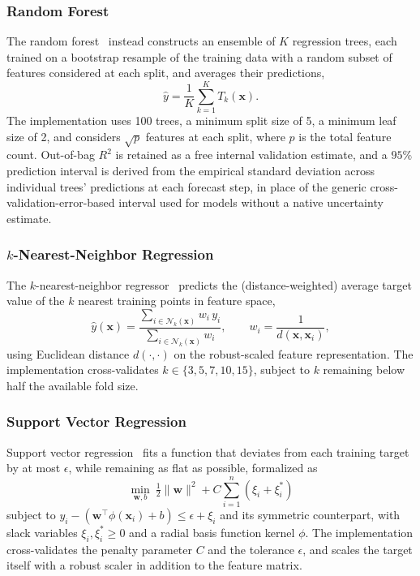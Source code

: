 \subsubsection{Random Forest}
The random forest~\cite{breiman2001randomforest} instead constructs an ensemble of $K$ regression trees, each trained on a bootstrap resample of the training data with a random subset of features considered at each split, and averages their predictions,
\begin{equation}
\hat{y} = \frac{1}{K}\sum_{k=1}^{K} T_k(\mathbf{x}).
\end{equation}
The implementation uses 100 trees, a minimum split size of 5, a minimum leaf size of 2, and considers $\sqrt{p}$ features at each split, where $p$ is the total feature count. Out-of-bag $R^2$ is retained as a free internal validation estimate, and a $95\%$ prediction interval is derived from the empirical standard deviation across individual trees' predictions at each forecast step, in place of the generic cross-validation-error-based interval used for models without a native uncertainty estimate.

\subsubsection{$k$-Nearest-Neighbor Regression}
The $k$-nearest-neighbor regressor~\cite{cover1967knn} predicts the (distance-weighted) average target value of the $k$ nearest training points in feature space,
\begin{equation}
\hat{y}(\mathbf{x}) = \frac{\sum_{i \in \mathcal{N}_k(\mathbf{x})} w_i\, y_i}{\sum_{i \in \mathcal{N}_k(\mathbf{x})} w_i}, \qquad w_i = \frac{1}{d(\mathbf{x}, \mathbf{x}_i)},
\end{equation}
using Euclidean distance $d(\cdot,\cdot)$ on the robust-scaled feature representation. The implementation cross-validates $k \in \{3,5,7,10,15\}$, subject to $k$ remaining below half the available fold size.

\subsubsection{Support Vector Regression}
Support vector regression~\cite{cortes1995svm} fits a function that deviates from each training target by at most $\epsilon$, while remaining as flat as possible, formalized as
\begin{equation}
\min_{\mathbf{w},b}\ \tfrac{1}{2}\|\mathbf{w}\|^2 + C\sum_{i=1}^n \left(\xi_i + \xi_i^{*}\right)
\end{equation}
subject to $y_i - (\mathbf{w}^\top\phi(\mathbf{x}_i)+b) \le \epsilon + \xi_i$ and its symmetric counterpart, with slack variables $\xi_i,\xi_i^{*}\ge 0$ and a radial basis function kernel $\phi$. The implementation cross-validates the penalty parameter $C$ and the tolerance $\epsilon$, and scales the target itself with a robust scaler in addition to the feature matrix.


